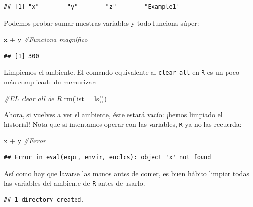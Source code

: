 \documentclass[]{tufte-book}
\newenvironment{Shaded}{}{}
\newcommand{\AttributeTok}[1]{\textcolor[rgb]{0.49,0.56,0.16}{#1}}
\newcommand{\CommentTok}[1]{\textcolor[rgb]{0.38,0.63,0.69}{\textit{#1}}}
\newcommand{\FunctionTok}[1]{\textcolor[rgb]{0.02,0.16,0.49}{#1}}
\newcommand{\NormalTok}[1]{#1}
\newcommand{\SpecialCharTok}[1]{\textcolor[rgb]{0.25,0.44,0.63}{#1}}
\begin{document}
\begin{verbatim}
## [1] "x"        "y"        "z"        "Example1"
\end{verbatim}

Podemos probar sumar nuestras variables y todo funciona súper:

\begin{Shaded}
\begin{Highlighting}[]
\NormalTok{x }\SpecialCharTok{+}\NormalTok{ y }\CommentTok{\#Funciona magnífico}
\end{Highlighting}
\end{Shaded}

\begin{verbatim}
## [1] 300
\end{verbatim}

Limpiemos el ambiente. El comando equivalente al \texttt{clear\ all} en
\texttt{R} es un poco más complicado de memorizar:

\begin{Shaded}
\begin{Highlighting}[]
\CommentTok{\#EL clear all de R}
\FunctionTok{rm}\NormalTok{(}\AttributeTok{list =} \FunctionTok{ls}\NormalTok{())}
\end{Highlighting}
\end{Shaded}

Ahora, si vuelves a ver el ambiente, éste estará vacío: ¡hemos limpiado
el historial! Nota que si intentamos operar con las variables,
\texttt{R} ya no las recuerda:

\begin{Shaded}
\begin{Highlighting}[]
\NormalTok{x }\SpecialCharTok{+}\NormalTok{ y }\CommentTok{\#Error}
\end{Highlighting}
\end{Shaded}

\begin{verbatim}
## Error in eval(expr, envir, enclos): object 'x' not found
\end{verbatim}

\begin{marginfigure}
Así como hay que lavarse las manos antes de comer, es buen hábito
limpiar todas las variables del ambiente de \texttt{R} antes de usarlo.
\end{marginfigure}

\begin{verbatim}
## 1 directory created.
\end{verbatim}
\end{document}
